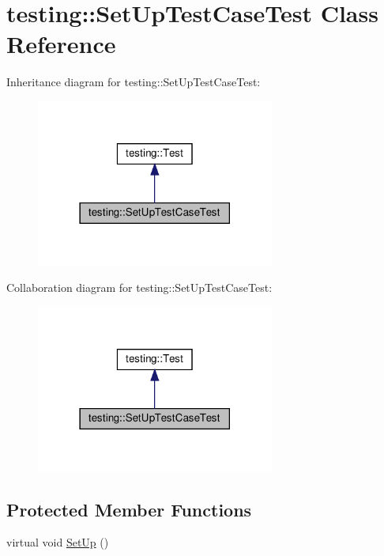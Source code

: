 \hypertarget{classtesting_1_1_set_up_test_case_test}{}\section{testing\+:\+:Set\+Up\+Test\+Case\+Test Class Reference}
\label{classtesting_1_1_set_up_test_case_test}


Inheritance diagram for testing\+:\+:Set\+Up\+Test\+Case\+Test\+:
\nopagebreak
\begin{figure}[H]
\begin{center}
\leavevmode
\includegraphics[width=222pt]{classtesting_1_1_set_up_test_case_test__inherit__graph}
\end{center}
\end{figure}


Collaboration diagram for testing\+:\+:Set\+Up\+Test\+Case\+Test\+:
\nopagebreak
\begin{figure}[H]
\begin{center}
\leavevmode
\includegraphics[width=222pt]{classtesting_1_1_set_up_test_case_test__coll__graph}
\end{center}
\end{figure}
\subsection*{Protected Member Functions}
\begin{DoxyCompactItemize}
\item 
virtual void \hyperlink{classtesting_1_1_set_up_test_case_test_a4b44551ccf73e66de7ec95b2ab3b2085}{Set\+Up} ()
\end{DoxyCompactItemize}
